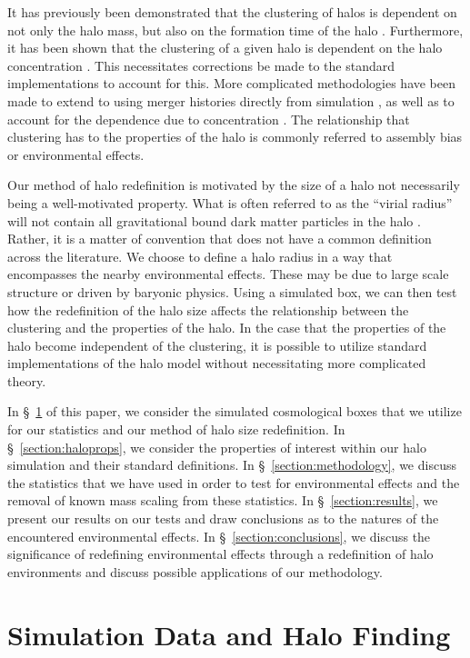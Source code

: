 \documentclass[usenatbib,usegraphicx,letterpaper]{mn2e}
\begin{document}
It has previously been demonstrated that the clustering of halos is dependent on not only the halo mass, but also on the formation time of the halo \citep{sheth04, gao05, croton07}. Furthermore, it has been shown that the clustering of a given halo is dependent on the halo concentration \citep{wechsler06}. This necessitates corrections be made to the standard implementations to account for this. More complicated methodologies have been made to extend to using merger histories directly from simulation \citep{dvorkin11}, as well as to account for the dependence due to concentration \citep{gil11}. The relationship that clustering has to the properties of the halo is commonly referred to assembly bias or environmental effects.

Our method of halo redefinition is motivated by the size of a halo not necessarily being a well-motivated property. What is often referred to as the ``virial radius'' will not contain all gravitational bound dark matter particles in the halo \citep{kazan06}. Rather, it is a matter of convention that does not have a common definition across the literature. We choose to define a halo radius in a way that encompasses the nearby environmental effects. These may be due to large scale structure or driven by baryonic physics. Using a simulated box, we can then test how the redefinition of the halo size affects the relationship between the clustering and the properties of the halo. In the case that the properties of the halo become independent of the clustering, it is possible to utilize standard implementations of the halo model without necessitating more complicated theory.
 
In \S~\ref{section:data} of this paper, we consider the simulated cosmological boxes that we utilize for our statistics and our method of halo size redefinition. In \S~\ref{section:haloprops}, we consider the properties of interest within our halo simulation and their standard definitions. In \S~\ref{section:methodology}, we discuss the statistics that we have used in order to test for environmental effects and the removal of known mass scaling from these statistics. In \S~\ref{section:results}, we present our results on our tests and draw conclusions as to the natures of the encountered environmental effects. In \S~\ref{section:conclusions}, we discuss the significance of redefining environmental effects through a redefinition of halo environments and discuss possible applications of our methodology.

\section[]{Simulation Data and Halo Finding}
\label{section:data}
\end{document}
